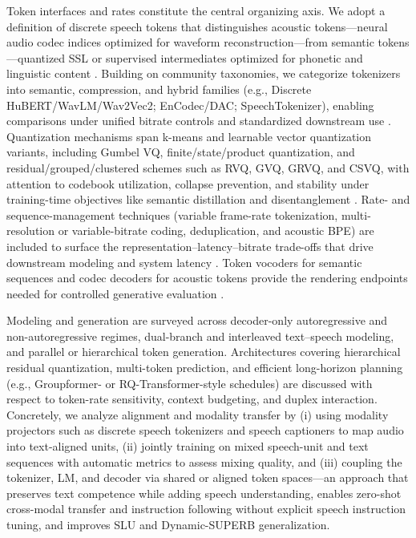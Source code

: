 \documentclass{article}
\begin{document}
Token interfaces and rates constitute the central organizing axis. We adopt a definition of discrete speech tokens that distinguishes acoustic tokens---neural audio codec indices optimized for waveform reconstruction---from semantic tokens---quantized SSL or supervised intermediates optimized for phonetic and linguistic content \cite{guo2025recentadvancesdiscretespeechtokensreview}. Building on community taxonomies, we categorize tokenizers into semantic, compression, and hybrid families (e.g., Discrete HuBERT/WavLM/Wav2Vec2; EnCodec/DAC; SpeechTokenizer), enabling comparisons under unified bitrate controls and standardized downstream use \cite{mousavi2024dasbdiscreteaudiospeechbenchmark}. Quantization mechanisms span k-means and learnable vector quantization variants, including Gumbel VQ, finite/state/product quantization, and residual/grouped/clustered schemes such as RVQ, GVQ, GRVQ, and CSVQ, with attention to codebook utilization, collapse prevention, and stability under training-time objectives like semantic distillation and disentanglement \cite{guo2025recentadvancesdiscretespeechtokensreview}. Rate- and sequence-management techniques (variable frame-rate tokenization, multi-resolution or variable-bitrate coding, deduplication, and acoustic BPE) are included to surface the representation--latency--bitrate trade-offs that drive downstream modeling and system latency \cite{guo2025recentadvancesdiscretespeechtokensreview}. Token vocoders for semantic sequences and codec decoders for acoustic tokens provide the rendering endpoints needed for controlled generative evaluation .



Modeling and generation are surveyed across decoder-only autoregressive and non-autoregressive regimes, dual-branch and interleaved text--speech modeling, and parallel or hierarchical token generation. Architectures covering hierarchical residual quantization, multi-token prediction, and efficient long-horizon planning (e.g., Groupformer- or RQ-Transformer-style schedules) are discussed with respect to token-rate sensitivity, context budgeting, and duplex interaction. Concretely, we analyze alignment and modality transfer by (i) using modality projectors such as discrete speech tokenizers and speech captioners to map audio into text-aligned units, (ii) jointly training on mixed speech-unit and text sequences with automatic metrics to assess mixing quality, and (iii) coupling the tokenizer, LM, and decoder via shared or aligned token spaces---an approach that preserves text competence while adding speech understanding, enables zero-shot cross-modal transfer and instruction following without explicit speech instruction tuning, and improves SLU and Dynamic-SUPERB generalization. \cite{lu2024destaenhancingspeechlanguagemodelsthroug,entry2025towardjointlanguagemodelingspeechunitste}
\end{document}
